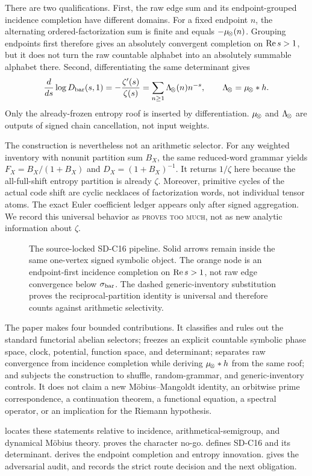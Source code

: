 There are two qualifications.  First, the raw edge sum and its
endpoint-grouped incidence completion have different domains.  For a fixed
endpoint $n$, the alternating ordered-factorization sum is finite and equals
$-\mu_{\!\otimes}(n)$.  Grouping endpoints first therefore gives an absolutely
convergent completion on $\operatorname{Re} s>1$, but it does not turn the raw countable
alphabet into an absolutely summable alphabet there.  Second, differentiating
the same determinant gives
\[
  \frac{d}{ds}\log D_{\rm bar}(s,1)
  =-\frac{\zeta'(s)}{\zeta(s)}
  =\sum_{n\ge1}\Lambda_{\!\otimes}(n)n^{-s},
  \qquad \Lambda_{\!\otimes}=\mu_{\!\otimes}*h.
\]
Only the already-frozen entropy roof is inserted by differentiation.
$\mu_{\!\otimes}$ and $\Lambda_{\!\otimes}$ are outputs of signed chain cancellation, not input
weights.

The construction is nevertheless not an arithmetic selector.  For any
weighted inventory with nonunit partition sum $B_X$, the same reduced-word
grammar yields $F_X=B_X/(1+B_X)$ and $D_X=(1+B_X)^{-1}$.  It returns
$1/\zeta$ here because the all-full-shift entropy partition is already
$\zeta$.  Moreover, primitive cycles of the actual code shift are cyclic
necklaces of factorization words, not individual tensor atoms.  The exact
Euler coefficient ledger appears only after signed aggregation.  We record
this universal behavior as \textsc{proves too much}, not as new analytic
information about $\zeta$.

\begin{figure}[t]
  \centering
  \resizebox{\textwidth}{!}{}
  \caption{The source-locked SD-C16 pipeline.  Solid arrows remain inside the
  same one-vertex signed symbolic object.  The orange node is an
  endpoint-first incidence completion on $\operatorname{Re} s>1$, not raw edge convergence
  below $\sigma_{\rm bar}$.  The dashed generic-inventory substitution proves the
  reciprocal-partition identity is universal and therefore counts against
  arithmetic selectivity.}
  \label{fig:pipeline}
\end{figure}

The paper makes four bounded contributions.  It classifies and rules out the
standard functorial abelian selectors; freezes an explicit countable symbolic
phase space, clock, potential, function space, and determinant; separates raw
convergence from incidence completion while deriving $\mu_{\!\otimes}*h$ from the
same roof; and subjects the construction to shuffle, random-grammar, and
generic-inventory controls.  It does not claim a new M\"obius--Mangoldt
identity, an orbitwise prime correspondence, a continuation theorem, a
functional equation, a spectral operator, or an implication for the Riemann
hypothesis.

 locates these statements relative to incidence,
arithmetical-semigroup, and dynamical M\"obius theory.
 proves the character no-go.
 defines SD-C16 and its determinant.
 derives the endpoint completion and entropy innovation.
 gives the adversarial audit, and
 records the strict route decision and the next obligation.
